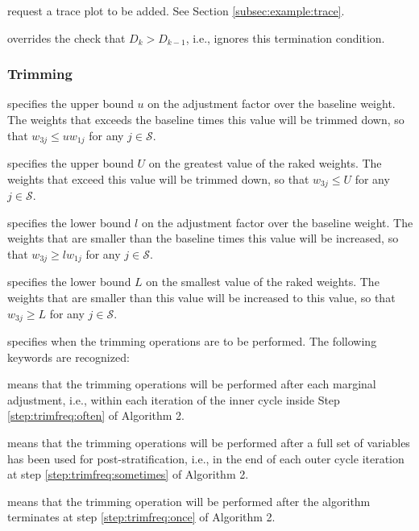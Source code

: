 \hangpara
{} request a trace plot to be added. See
Section \ref{subsec:example:trace}.

\hangpara
{} overrides the check
that $D_k > D_{k-1}$, i.e., ignores this termination condition.

\subsubsection{Trimming}
\label{subsubsec:trimming}

\hangpara
{} specifies the upper bound $u$ on the adjustment
    factor over the baseline weight. The weights
    that exceeds the baseline times this value will be trimmed down,
    so that $w_{3j} \le u w_{1j}$ for any $j\in\mathcal{S}$.

\hangpara
{} specifies the upper bound $U$ on the greatest
    value of the raked weights.  The weights that
    exceed this value will be trimmed down, so that
    $w_{3j} \le U$ for any $j\in\mathcal{S}$.

\hangpara
{} specifies the lower bound $l$ on the adjustment factor
    over the baseline weight.  The weights that are smaller than the baseline
    times this value will be increased, so that
    $w_{3j} \ge l w_{1j}$ for any $j\in\mathcal{S}$.

\hangpara
{} specifies the lower bound $L$ on the smallest value
    of the raked weights.  The weights that are smaller than this value will
    be increased to this value, so that
    $w_{3j} \ge L$ for any $j\in\mathcal{S}$.

\hangpara
{} specifies when the trimming operations
    are to be performed. The following keywords are recognized:

\morehang {} means that the trimming operations will be performed
    after each marginal adjustment, i.e., within each iteration of the inner 
    cycle inside Step \ref{step:trimfreq:often} of Algorithm 2.

\morehang {} means that the trimming operations will be performed
    after a full set of variables has been used for post-stratification, i.e.,
    in the end of each outer cycle iteration at step \ref{step:trimfreq:sometimes} of
    Algorithm 2.

\morehang {}
    means that the trimming operation will be performed after the algorithm terminates
    at step \ref{step:trimfreq:once} of Algorithm 2.

